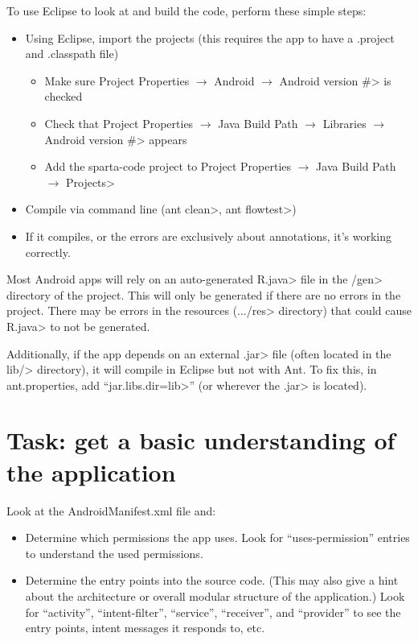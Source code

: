To use Eclipse to look at and build the code, perform these simple
steps:
\begin{itemize}
\item
Using Eclipse, import the projects (this requires the app to have a
.project and .classpath file)
  \begin{itemize}
    \item
    Make sure
    \<Project Properties $\rightarrow$ Android $\rightarrow$ Android
    version \#> is checked

    \item
    Check that
    \<Project Properties $\rightarrow$ Java Build Path $\rightarrow$
    Libraries $\rightarrow$ Android version \#> appears

    \item
    Add the sparta-code project to
    \<Project Properties $\rightarrow$ Java Build Path $\rightarrow$ Projects>
  \end{itemize}

\item Compile via command line (\<ant clean>, \<ant flowtest>)

\item If it compiles, or the errors are exclusively about annotations,
  it's working correctly.
\end{itemize}

Most Android apps will rely on an auto-generated \<R.java> file
in the \</gen> directory of the project. This will only be generated
if there are no errors in the project. There may be errors in the
resources (\<.../res> directory) that could cause \<R.java> to not be
generated.

Additionally, if the app depends on an external \<.jar> file (often
located in the \<lib/> directory), it will compile in Eclipse but not
with Ant. To fix this, in ant.properties, add ``\<jar.libs.dir=lib>''
(or wherever the \<.jar> is located).


\section{Task: get a basic understanding of the application}

Look at the AndroidManifest.xml file and:
\begin{itemize}
\item Determine which permissions the app uses.
  Look for ``uses-permission'' entries to understand the used
  permissions.
\item Determine the entry points into the source code. (This may also give
  a hint about the architecture or overall modular structure of the
  application.)
  Look for ``activity'', ``intent-filter'', ``service'', ``receiver'', and
  ``provider'' to see the entry points, intent messages it responds to,
  etc.
\end{itemize}


